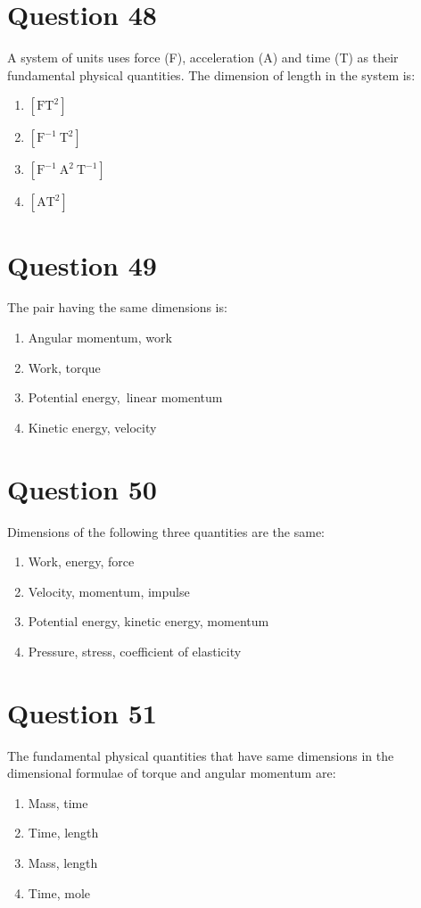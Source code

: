 \documentclass{article}
\begin{document}
\section*{Question 48}
A system of units uses force (F), acceleration (A) and time (T) as their fundamental physical quantities. The dimension of length in the system is:
\begin{enumerate}[label=(\alph*)]
\item \([\mathrm{FT}^2]\)
\item \([\mathrm{F}^{-1} \mathrm{~T}^2]\)
\item \([\mathrm{F}^{-1} \mathrm{~A}^2 \mathrm{~T}^{-1}]\)
\item \([\mathrm{AT}^2]\)
\end{enumerate}
\newpage
\section*{Question 49}
The pair having the same dimensions is:
\begin{enumerate}[label=(\alph*)]
\item Angular momentum, work
\item Work, torque
\item Potential energy, linear momentum
\item Kinetic energy, velocity
\end{enumerate}
\newpage
\section*{Question 50}
Dimensions of the following three quantities are the same:
\begin{enumerate}[label=(\alph*)]
\item Work, energy, force
\item Velocity, momentum, impulse
\item Potential energy, kinetic energy, momentum
\item Pressure, stress, coefficient of elasticity
\end{enumerate}
\newpage
\section*{Question 51}
The fundamental physical quantities that have same dimensions in the dimensional formulae of torque and angular momentum are:
\begin{enumerate}[label=(\alph*)]
\item Mass, time
\item Time, length
\item Mass, length
\item Time, mole
\end{enumerate}
\newpage
\end{document}
